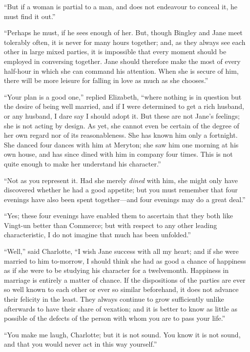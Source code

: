 \documentclass[12pt,english]{book}
\begin{document}
{}``But if a woman is partial to a man, and does not endeavour to
conceal it, he must find it out.''

{}``Perhaps he must, if he sees enough of her. But, though Bingley
and Jane meet tolerably often, it is never for many hours together;
and, as they always see each other in large mixed parties, it is impossible
that every moment should be employed in conversing together. Jane
should therefore make the most of every half-hour in which she can
command his attention. When she is secure of him, there will be more
leisure for falling in love as much as she chooses.''

{}``Your plan is a good one,'' replied Elizabeth, {}``where nothing
is in question but the desire of being well married, and if I were
determined to get a rich husband, or any husband, I dare say I should
adopt it. But these are not Jane's feelings; she is not acting by
design. As yet, she cannot even be certain of the degree of her own
regard nor of its reasonableness. She has known him only a fortnight.
She danced four dances with him at Meryton; she saw him one morning
at his own house, and has since dined with him in company four times.
This is not quite enough to make her understand his character.''

{}``Not as you represent it. Had she merely \textit{dined} with him,
she might only have discovered whether he had a good appetite; but
you must remember that four evenings have also been spent together\mbox{---}and
four evenings may do a great deal.''

{}``Yes; these four evenings have enabled them to ascertain that
they both like Vingt-un better than Commerce; but with respect to
any other leading characteristic, I do not imagine that much has been
unfolded.''

{}``Well,'' said Charlotte, {}``I wish Jane success with all my
heart; and if she were married to him to-morrow, I should think she
had as good a chance of happiness as if she were to be studying his
character for a twelvemonth. Happiness in marriage is entirely a matter
of chance. If the dispositions of the parties are ever so well known
to each other or ever so similar beforehand, it does not advance their
felicity in the least. They always continue to grow sufficiently unlike
afterwards to have their share of vexation; and it is better to know
as little as possible of the defects of the person with whom you are
to pass your life.''

{}``You make me laugh, Charlotte; but it is not sound. You know it
is not sound, and that you would never act in this way yourself.''
\end{document}

